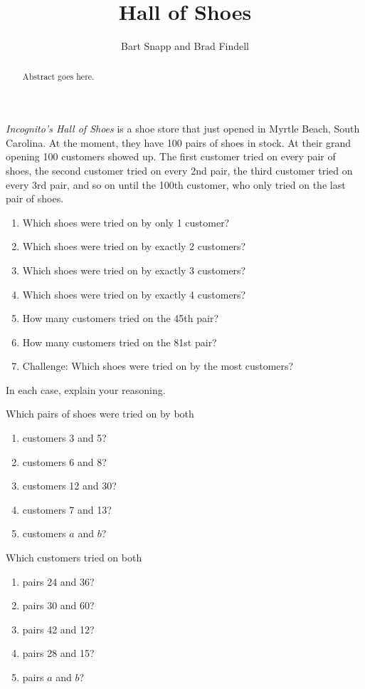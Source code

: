 \documentclass{ximera}
\title{Hall of Shoes}
\author{Bart Snapp and Brad Findell}
\begin{document}
\begin{abstract}
Abstract goes here.  
\end{abstract}
\maketitle

\label{A:Hall}
  
\begin{problem}  
\textit{Incognito's Hall of Shoes} is a shoe store that just
  opened in Myrtle Beach, South Carolina. At the moment, they have 100
  pairs of shoes in stock. At their grand opening 100 customers showed
  up. The first customer tried on every pair of shoes, the second
  customer tried on every 2nd pair, the third customer tried on every
  3rd pair, and so on until the 100th customer, who only tried on the
  last pair of shoes.
\begin{enumerate}
\item Which shoes were tried on by only 1 customer?
\item Which shoes were tried on by exactly 2 customers?
\item Which shoes were tried on by exactly 3 customers?
\item Which shoes were tried on by exactly 4 customers?
\item How many customers tried on the 45th pair?  
\item How many customers tried on the 81st pair?  
\item Challenge:  Which shoes were tried on by the most customers?  
\end{enumerate}
In each case, explain your reasoning.
\end{problem}

\begin{problem}
Which pairs of shoes were tried on by both 
\begin{enumerate}
\item customers 3 and 5?
\item customers 6 and 8?
\item customers 12 and 30?
\item customers 7 and 13?
\item customers $a$ and $b$?  
\end{enumerate}
\end{problem}

\begin{problem}
Which customers tried on both 
\begin{enumerate}
\item pairs 24 and 36?
\item pairs 30 and 60?
\item pairs 42 and 12?
\item pairs 28 and 15?
\item pairs $a$ and $b$?  
\end{enumerate}
\end{problem}
\end{document}
